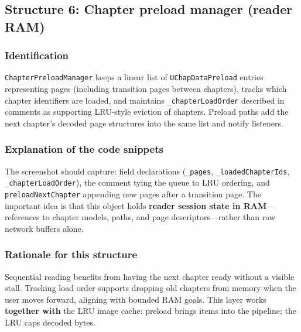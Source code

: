 
\subsection{Structure 6: Chapter preload manager (reader RAM)}

\subsubsection*{Identification}
\texttt{ChapterPreloadManager} keeps a linear list of \texttt{UChapDataPreload} entries representing pages (including transition pages between chapters), tracks which chapter identifiers are loaded, and maintains \texttt{\_chapterLoadOrder} described in comments as supporting LRU-style eviction of chapters. Preload paths add the next chapter's decoded page structures into the same list and notify listeners.

\subsubsection*{Explanation of the code snippets}
The screenshot should capture: field declarations (\texttt{\_pages}, \texttt{\_loadedChapterIds}, \texttt{\_chapterLoadOrder}), the comment tying the queue to LRU ordering, and \texttt{preloadNextChapter} appending new pages after a transition page. The important idea is that this object holds \textbf{reader session state in RAM}---references to chapter models, paths, and page descriptors---rather than raw network buffers alone.

\subsubsection*{Rationale for this structure}
Sequential reading benefits from having the next chapter ready without a visible stall. Tracking load order supports dropping old chapters from memory when the user moves forward, aligning with bounded RAM goals. This layer works \textbf{together with} the LRU image cache: preload brings items into the pipeline; the LRU caps decoded bytes.


